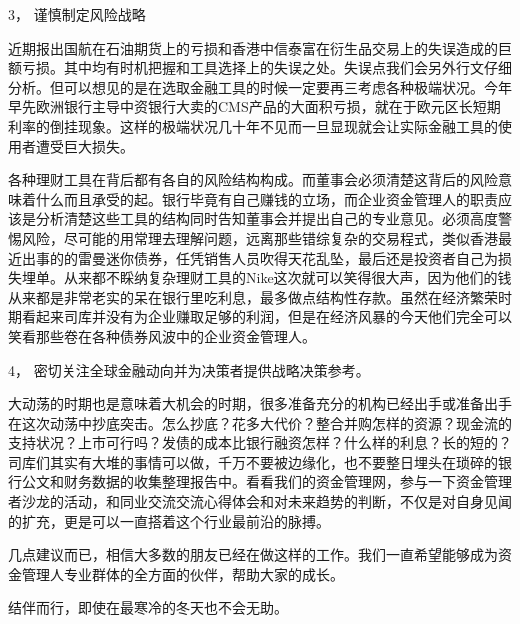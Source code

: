     3， 谨慎制定风险战略

    近期报出国航在石油期货上的亏损和香港中信泰富在衍生品交易上的失误造成的巨额亏损。其中均有时机把握和工具选择上的失误之处。失误点我们会另外行文仔细分析。但可以想见的是在选取金融工具的时候一定要再三考虑各种极端状况。今年早先欧洲银行主导中资银行大卖的CMS产品的大面积亏损，就在于欧元区长短期利率的倒挂现象。这样的极端状况几十年不见而一旦显现就会让实际金融工具的使用者遭受巨大损失。

    各种理财工具在背后都有各自的风险结构构成。而董事会必须清楚这背后的风险意味着什么而且承受的起。银行毕竟有自己赚钱的立场，而企业资金管理人的职责应该是分析清楚这些工具的结构同时告知董事会并提出自己的专业意见。必须高度警惕风险，尽可能的用常理去理解问题，远离那些错综复杂的交易程式，类似香港最近出事的的雷曼迷你债券，任凭销售人员吹得天花乱坠，最后还是投资者自己为损失埋单。从来都不睬纳复杂理财工具的Nike这次就可以笑得很大声，因为他们的钱从来都是非常老实的呆在银行里吃利息，最多做点结构性存款。虽然在经济繁荣时期看起来司库并没有为企业赚取足够的利润，但是在经济风暴的今天他们完全可以笑看那些卷在各种债券风波中的企业资金管理人。

    4， 密切关注全球金融动向并为决策者提供战略决策参考。

    大动荡的时期也是意味着大机会的时期，很多准备充分的机构已经出手或准备出手在这次动荡中抄底突击。怎么抄底？花多大代价？整合并购怎样的资源？现金流的支持状况？上市可行吗？发债的成本比银行融资怎样？什么样的利息？长的短的？司库们其实有大堆的事情可以做，千万不要被边缘化，也不要整日埋头在琐碎的银行公文和财务数据的收集整理报告中。看看我们的资金管理网，参与一下资金管理者沙龙的活动，和同业交流交流心得体会和对未来趋势的判断，不仅是对自身见闻的扩充，更是可以一直搭着这个行业最前沿的脉搏。

    几点建议而已，相信大多数的朋友已经在做这样的工作。我们一直希望能够成为资金管理人专业群体的全方面的伙伴，帮助大家的成长。

    结伴而行，即使在最寒冷的冬天也不会无助。
